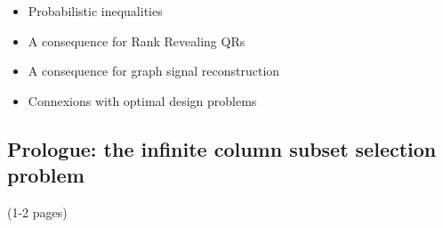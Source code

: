 \documentclass[twoside,11pt]{book}
\numberwithin{theorem}{chapter}
\numberwithin{definition}{chapter}
\numberwithin{proposition}{chapter}
\numberwithin{corollary}{chapter}
\numberwithin{example}{chapter}
\numberwithin{lemma}{chapter}
\numberwithin{assumption}{chapter}
\numberwithin{equation}{chapter}
\numberwithin{figure}{chapter}
\begin{document}
\begin{itemize}
\item Probabilistic inequalities
\item A consequence for Rank Revealing QRs
\item A consequence for graph signal reconstruction
\item Connexions with optimal design problems
\end{itemize}
\subsection{Prologue: the infinite column subset selection problem} (1-2 pages)


\listoffigures

\listoftables





\end{document}
